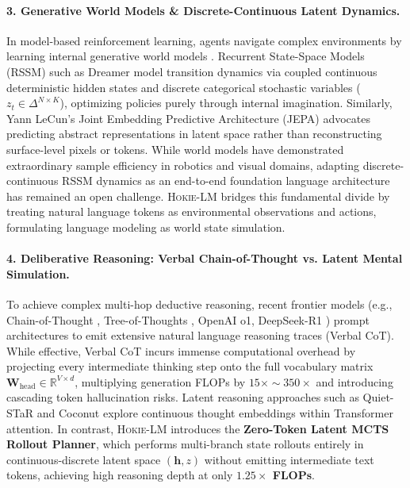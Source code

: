 \paragraph{3. Generative World Models \& Discrete-Continuous Latent Dynamics.}
In model-based reinforcement learning, agents navigate complex environments by learning internal generative world models \citep{ha2018world}. 
Recurrent State-Space Models (RSSM) such as Dreamer \citep{hafner2023mastering,hafner2024dreamerv3} model transition dynamics via coupled continuous deterministic hidden states and discrete categorical stochastic variables ($z_t \in \Delta^{N \times K}$), optimizing policies purely through internal imagination. 
Similarly, Yann LeCun's Joint Embedding Predictive Architecture (JEPA) \citep{lecun2022path} advocates predicting abstract representations in latent space rather than reconstructing surface-level pixels or tokens. 
While world models have demonstrated extraordinary sample efficiency in robotics and visual domains, adapting discrete-continuous RSSM dynamics as an end-to-end foundation language architecture has remained an open challenge. 
\textsc{Hokie-LM} bridges this fundamental divide by treating natural language tokens as environmental observations and actions, formulating language modeling as world state simulation.

\paragraph{4. Deliberative Reasoning: Verbal Chain-of-Thought vs. Latent Mental Simulation.}
To achieve complex multi-hop deductive reasoning, recent frontier models (e.g., Chain-of-Thought \citep{wei2022chain}, Tree-of-Thoughts \citep{yao2023tree}, OpenAI o1, DeepSeek-R1 \citep{deepseek2025r1}) prompt architectures to emit extensive natural language reasoning traces (Verbal CoT). 
While effective, Verbal CoT incurs immense computational overhead by projecting every intermediate thinking step onto the full vocabulary matrix $\mathbf{W}_{\text{head}} \in \mathbb{R}^{V \times d}$, multiplying generation FLOPs by $15\times \sim 350\times$ and introducing cascading token hallucination risks. 
Latent reasoning approaches such as Quiet-STaR \citep{zelikman2024quietstar} and Coconut \citep{hao2024training} explore continuous thought embeddings within Transformer attention. 
In contrast, \textsc{Hokie-LM} introduces the \textbf{Zero-Token Latent MCTS Rollout Planner}, which performs multi-branch state rollouts entirely in continuous-discrete latent space $(\mathbf{h}, z)$ without emitting intermediate text tokens, achieving high reasoning depth at only \textbf{$1.25\times$ FLOPs}.


